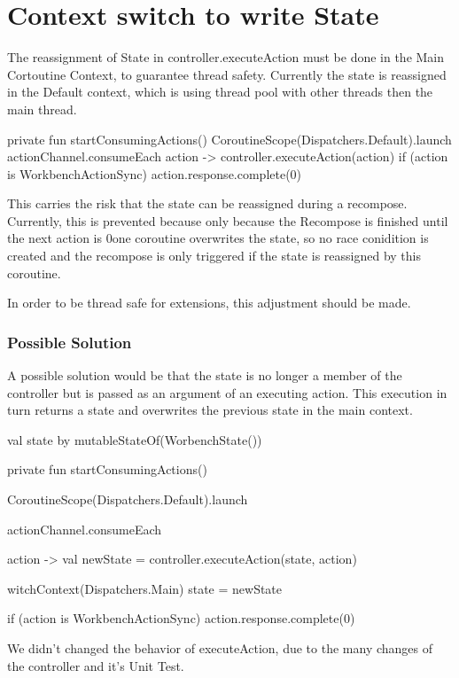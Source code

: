 \section{Context switch to write State}
The reassignment of State in controller.executeAction must be done in the Main Cortoutine Context, to guarantee thread safety.
Currently the state is reassigned in the Default context, which is using thread pool with other threads then the main thread. 
\begin{kotlincode}
private fun startConsumingActions() {
    CoroutineScope(Dispatchers.Default).launch {
        actionChannel.consumeEach { action ->
            controller.executeAction(action)
            if (action is WorkbenchActionSync) {
                action.response.complete(0)
            }
        }
    }
}
\end{kotlincode}
This carries the risk that the state can be reassigned during a recompose.
Currently, this is prevented because only because the Recompose is finished until the next action is 0one coroutine overwrites the state, so no race conidition is created and the recompose is only triggered if the state is reassigned by this coroutine. 

In order to be thread safe for extensions, this adjustment should be made.

\subsubsection{Possible Solution}

A possible solution would be that the state is no longer a member of the controller but is passed as an argument of an executing action. This execution in turn returns a state and overwrites the previous state in the main context.

\begin{kotlincode}

val state by mutableStateOf(WorbenchState())

private fun startConsumingActions() {
    CoroutineScope(Dispatchers.Default).launch {
        actionChannel.consumeEach { action ->
            val newState = controller.executeAction(state, action)

            witchContext(Dispatchers.Main) {
                state = newState
            }
            
            if (action is WorkbenchActionSync) {
                action.response.complete(0)
            }
        }
    }
}
\end{kotlincode}

We didn't changed the behavior of executeAction, due to the many changes of the controller and it's Unit Test.